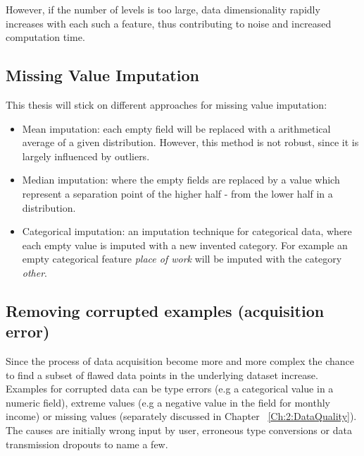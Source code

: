 However, if the number of levels is too large, data dimensionality rapidly increases with each such a feature, thus contributing to noise and increased computation time.


\subsection{Missing Value Imputation}\label{Ch:2:MVI} 
This thesis will stick on different approaches for missing value imputation:

\begin{itemize}
    
        \item Mean imputation: each empty field will be replaced with a arithmetical average of a given distribution. However, this method is not robust, since it is largely influenced by outliers.
        
        \item Median imputation: where the empty fields are replaced by a value which represent a separation point of the higher half - from the lower half in a distribution. 
        
        \item Categorical imputation: an imputation technique for categorical data, where each empty value is imputed with a new invented category. For example an empty categorical feature \textit{place of work} will be imputed with the category \textit{other}. %
        
\end{itemize}



\subsection{Removing corrupted examples (acquisition error)}\label{Ch:2:RCD}
Since the process of data acquisition become more and more complex the chance to find a subset of flawed data points in the underlying dataset increase. Examples for corrupted data can be type errors (e.g a categorical value in a numeric field), extreme values (e.g a negative value in the field for monthly income) or missing values (separately discussed in Chapter ~\ref{Ch:2:DataQuality}). The causes are initially wrong input by user, erroneous type conversions or data transmission dropouts to name a few. 

